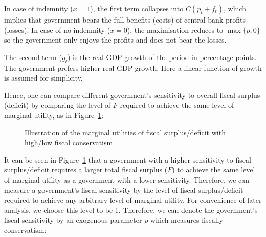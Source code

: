 \documentclass[
  a4paper,
  abstract=true]{scrartcl}
\theoremstyle{definition}
\begin{document}
In case of indemnity (\(x=1\)), the first term collapses into
\(C(p_t+f_t)\), which implies that government bears the full benefits
(costs) of central bank profits (losses). In case of no indemnity
(\(x=0\)), the maximisation reduces to \(\max\{p,0\}\) so the government
only enjoys the profits and does not bear the losses.

The second term (\(g_t\)) is the real GDP growth of the period in
percentage points. The government prefers higher real GDP growth. Here a
linear function of growth is assumed for simplicity.

Hence, one can compare different government's sensitivity to overall
fiscal surplus (deficit) by comparing the level of \(F\) required to
achieve the same level of marginal utility, as in
Figure~\ref{fig-marginal-C}:

\begin{figure}


\caption{\label{fig-marginal-C}Illustration of the marginal utilities of
fiscal surplus/deficit with high/low fiscal conservatism}

\end{figure}%

It can be seen in Figure~\ref{fig-marginal-C} that a government with a
higher sensitivity to fiscal surplus/deficit requires a larger total
fiscal surplus (\(F\)) to achieve the same level of marginal utility as
a government with a lower sensitivity. Therefore, we can measure a
government's fiscal sensitivity by the level of fiscal surplus/deficit
required to achieve any arbitrary level of marginal utility. For
convenience of later analysis, we choose this level to be 1. Therefore,
we can denote the government's fiscal sensitivity by an exogenous
parameter \(\rho\) which measures fiscally conservatism:
\end{document}
